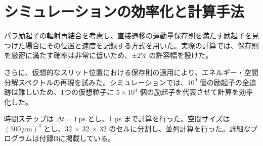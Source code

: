 \section{シミュレーションの効率化と計算手法}

パラ励起子の輻射再結合を考慮し、直接遷移の運動量保存則を満たす励起子を見つけた場合にその位置と速度を記録する方式を用いた。実際の計算では、保存則を厳密に満たす確率は非常に低いため、±2\% の許容幅を設けた。

さらに、仮想的なスリット位置における保存則の適用により、エネルギー・空間分解スペクトルの再現を試みた。シミュレーションでは、$10^9$ 個の励起子の全追跡は難しいため、1つの仮想粒子に $5 \times 10^4$ 個の励起子を代表させて計算を効率化した。

時間ステップは $\Delta t = 1 \, \text{ps}$ とし、1 µs まで計算を行った。空間サイズは $(500 \, \mu\text{m})^3$ とし、32 × 32 × 32 のセルに分割し、並列計算を行った。詳細なプログラムは付録Bに掲載している。
